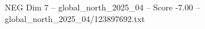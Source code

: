 \begin{textsample}{NEG Dim 7 – global\_north\_2025\_04 – Score -7.00 – global\_north\_2025\_04/123897692.txt}
\end{textsample}

